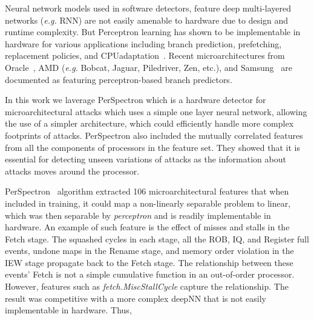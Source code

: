  


Neural network models used in software detectors, feature deep multi-layered  networks ({\em e.g.} RNN) are not easily amenable to hardware due to design and runtime complexity. But Perceptron learning has shown to be implementable in hardware for various  applications including branch prediction, prefetching, replacement policies, and CPUadaptation~\cite{intelISCA2019}. Recent microarchitectures from Oracle~\cite{SPARCT4}, AMD ({\em e.g.} Bobcat, Jaguar, Piledriver, Zen, etc.), and Samsung~\cite{Mongoose,M3} are documented as featuring perceptron-based branch predictors.
 

In this work we laverage PerSpectron which is a  hardware detector for microarchitectural attacks which uses a simple one layer neural network,  allowing the use of a simpler architecture, which could efficiently 
handle more complex footprints of attacks. 
PerSpectron also included the mutually correlated features from all the components of processors in the feature set. They showed that it is essential for detecting unseen variations of attacks as the information about attacks moves around the processor.


PerSpectron~\cite{PerSpectron} algorithm extracted 106 microarchitectural features that when included in training, it could map a non-linearly separable problem to linear, which was then 
separable by {\em perceptron} and is readily implementable in hardware. An example of such feature is the effect of misses and stalls 
in the Fetch stage. The squashed cycles in each stage, all the ROB, IQ, and 
Register full events, undone maps in the Rename stage, and memory order 
violation in the IEW stage propagate back to the Fetch stage. The relationship 
between these events' Fetch is not a simple cumulative function in an out-of-order 
processor. 
However, features such as \textit{fetch.MiscStallCycle} capture the 
relationship.
The result was competitive 
with a more complex deepNN that is not easily implementable in hardware. Thus, 

